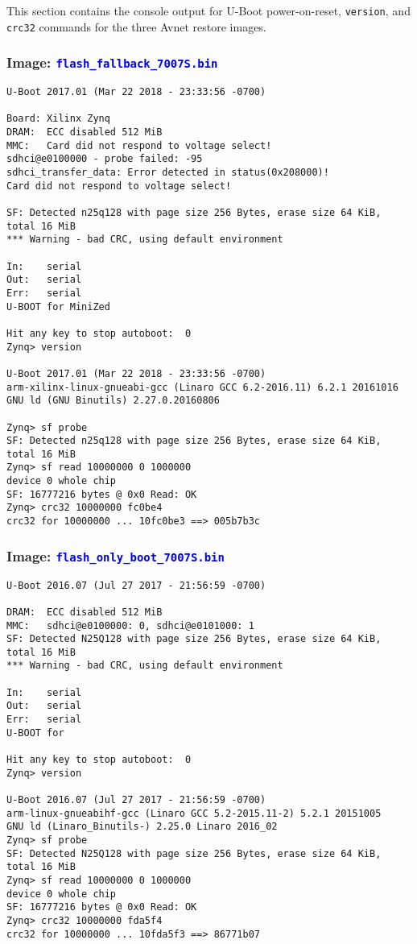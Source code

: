 This section contains the console output for U-Boot power-on-reset,
\verb+version+, and \verb+crc32+ commands for the three Avnet restore
images.

\subsubsection*{Image: \textcolor{blue}{\texttt{flash\_fallback\_7007S.bin}}}
%
\begin{verbatim}
U-Boot 2017.01 (Mar 22 2018 - 23:33:56 -0700)

Board: Xilinx Zynq
DRAM:  ECC disabled 512 MiB
MMC:   Card did not respond to voltage select!
sdhci@e0100000 - probe failed: -95
sdhci_transfer_data: Error detected in status(0x208000)!
Card did not respond to voltage select!

SF: Detected n25q128 with page size 256 Bytes, erase size 64 KiB, total 16 MiB
*** Warning - bad CRC, using default environment

In:    serial
Out:   serial
Err:   serial
U-BOOT for MiniZed

Hit any key to stop autoboot:  0
Zynq> version

U-Boot 2017.01 (Mar 22 2018 - 23:33:56 -0700)
arm-xilinx-linux-gnueabi-gcc (Linaro GCC 6.2-2016.11) 6.2.1 20161016
GNU ld (GNU Binutils) 2.27.0.20160806

Zynq> sf probe
SF: Detected n25q128 with page size 256 Bytes, erase size 64 KiB, total 16 MiB
Zynq> sf read 10000000 0 1000000
device 0 whole chip
SF: 16777216 bytes @ 0x0 Read: OK
Zynq> crc32 10000000 fc0be4
crc32 for 10000000 ... 10fc0be3 ==> 005b7b3c
\end{verbatim}

\subsubsection*{Image: \textcolor{blue}{\texttt{flash\_only\_boot\_7007S.bin}}}
%
\begin{verbatim}
U-Boot 2016.07 (Jul 27 2017 - 21:56:59 -0700)

DRAM:  ECC disabled 512 MiB
MMC:   sdhci@e0100000: 0, sdhci@e0101000: 1
SF: Detected N25Q128 with page size 256 Bytes, erase size 64 KiB, total 16 MiB
*** Warning - bad CRC, using default environment

In:    serial
Out:   serial
Err:   serial
U-BOOT for

Hit any key to stop autoboot:  0
Zynq> version

U-Boot 2016.07 (Jul 27 2017 - 21:56:59 -0700)
arm-linux-gnueabihf-gcc (Linaro GCC 5.2-2015.11-2) 5.2.1 20151005
GNU ld (Linaro_Binutils-) 2.25.0 Linaro 2016_02
Zynq> sf probe
SF: Detected N25Q128 with page size 256 Bytes, erase size 64 KiB, total 16 MiB
Zynq> sf read 10000000 0 1000000
device 0 whole chip
SF: 16777216 bytes @ 0x0 Read: OK
Zynq> crc32 10000000 fda5f4
crc32 for 10000000 ... 10fda5f3 ==> 86771b07
\end{verbatim}

